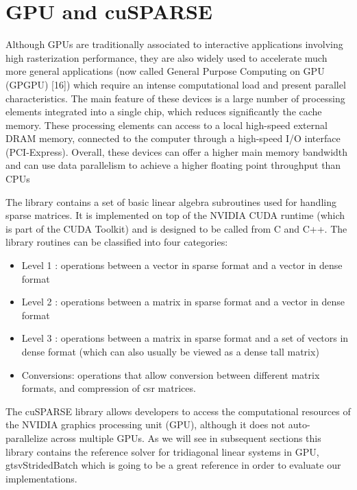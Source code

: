 \section{GPU and cuSPARSE}

Although GPUs are traditionally associated to interactive applications involving high
rasterization performance, they are also widely used to accelerate much more general
applications (now called General Purpose Computing on GPU (GPGPU) [16]) which
require an intense computational load and present parallel characteristics. The main
feature of these devices is a large number of processing elements integrated into a single chip, which reduces significantly the cache memory. These processing elements
can access to a local high-speed external DRAM memory, connected to the computer
through a high-speed I/O interface (PCI-Express). Overall, these devices can offer a
higher main memory bandwidth and can use data parallelism to achieve a higher floating point throughput than CPUs

The \cite{cuSPARSE} library contains a set of basic linear algebra subroutines used for
handling sparse matrices. It is implemented on top of the NVIDIA CUDA runtime (which is part of the CUDA Toolkit) and is designed to be called from C and C++.
The library routines can be classified into four categories:

\begin{itemize}
    \item Level 1 : operations between a vector in sparse format and a vector in dense
    format
    \item Level 2 : operations between a matrix in sparse format and a vector in dense
    format
    \item Level 3 : operations between a matrix in sparse format and a set of vectors in
    dense format (which can also usually be viewed as a dense tall matrix)
    \item Conversions: operations that allow conversion between different matrix formats,
    and compression of csr matrices.
\end{itemize}

The cuSPARSE library allows developers to access the computational resources of the
NVIDIA graphics processing unit (GPU), although it does not auto-parallelize across
multiple GPUs. As we will see in subsequent sections this library contains the reference
solver for tridiagonal linear systems in GPU, gtsvStridedBatch which is going to be a
great reference in order to evaluate our implementations.


